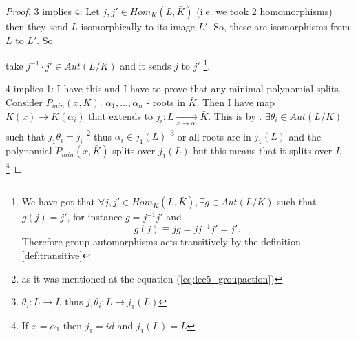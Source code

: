 \begin{theorem}
\begin{proof}
    3 implies 4: Let $j, j' \in Hom_K\left(L, \bar{K}\right)$
    (i.e. we took 2 homomorphisms)
    then
    they send $L$ isomorphically to its image $L'$. So, these are
    isomorphisms from $L$ to $L'$. So

    
    take $j^{-1} \cdot j' \in Aut \left(L/K\right)$ and it sends $j$
    to $j'$
    \footnote{
      We have got that $\forall j, j' \in Hom_K\left(L,
      \bar{K}\right), \exists g \in Aut\left(L/K\right)$
      such that $g(j) = j'$, for instance $g = j^{-1}j'$ and
      \begin{equation}
        g(j) \equiv j g = j j^{-1} j' = j'.
        \label{eq:lec5_groupaction}
      \end{equation}
        Therefore group
      automorphisms acts transitively by the definition
      \ref{def:transitive}
    }.

    4 implies 1:  I have this  and I have to prove
    that any minimal polynomial splits. Consider
    $P_{min}\left(x, K\right)$. $\alpha_1, \dots, \alpha_n$ - roots in
    $\bar{K}$. Then I have map $K\left(x\right) \to
    K\left(\alpha_i\right)$ that extends to
    $j_i: L \xrightarrow[x \to \alpha_i]{} \bar{K}$. This is by
    .
    $\exists \theta_i \in Aut\left(L/K\right)$ such that
    $j_1 \theta_i = j_i$
    \footnote{
      as it was mentioned at the equation (\ref{eq:lec5_groupaction})
    }
    thus
    $\alpha_i \in j_1\left(L\right)$
    \footnote{
      $\theta_i: L \to L$ thus $j_1 \theta_i: L \to j_1(L)$
    }
    or all roots are in
    $j_1\left(L\right)$ and the polynomial
    $P_{min}\left(x, \bar{K}\right)$ splits over $j_1\left(L\right)$
    but this means that it splits over $L$
    \footnote{
      If $x = \alpha_1$ then $j_1 = id$ and $j_1(L) = L$
    }
  \end{proof}
\end{theorem}

